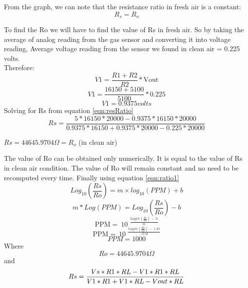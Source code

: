 				From the graph, we can note that the resistance ratio in fresh air is a constant: \\
				\[R_s = R_o\]
				\par To find the Ro we will have to find the value of Rs in fresh air. So by taking the average of analog reading from the gas sensor and converting it into voltage reading, Average voltage reading from the sensor we found in clean air = 0.225 volts. \\
				Therefore: \\
				\[V1= \frac{R\mathrm{1+}R\mathrm{2}}{R\mathrm{2}}*\mathrm{Vout}\]
				\[V1= \frac{\mathrm{16150+5100}}{\mathrm{5100}}*0.225\]
				\[V1= 0.9375 volts\]
				Solving for Rs from equation \ref{eqn:resRatio} \\
				\[Rs=\frac{5*16150*20000-0.9375*16150*20000}{0.9375*16150+0.9375*20000-0.225*20000}\] 
				\begin{center}
				$Rs = 44645.9704\Omega = R_o $ (in clean air)
				\end{center}
				\par The value of Ro can be obtained only numerically. It is equal to the value of Rs in clean air condition. The value of Ro will remain constant and no need to be recomputed every time.
				Finally using equation \ref{eqn:ratio1} \\
				\[Log_10(\frac{Rs}{Ro}) = m\times log_10(PPM) + b\]
				\[m * Log(PPM) = Log_10(\frac{Rs}{Ro}) - b\] 
				\[\mathrm{PPM=\ }{\mathrm{10}}^{\ \ \frac{\mathrm{Log}\mathrm{10\ }\left(\frac{Rs}{Ro}\right)\mathrm{\ -\ b}}{m}}\] 		
				\[\mathrm{PPM=\ }{\mathrm{10}}^{\ \ \frac{\mathrm{Log}\mathrm{10\ }\left(\frac{Rs}{Ro}\right)\mathrm{\ -\ 1.23}}{-0.41}}\] 
				\[PPM=1000\]
				Where \\
				\[Ro=44645.9704\Omega  \]
				and \\
				
				\[\small Rs=\frac{Vs*R1*RL-V1*R1*RL}{V1*R1+V1*RL-Vout*RL}\] 
				
